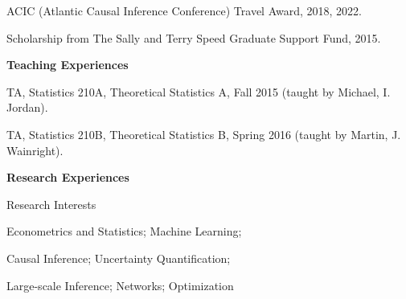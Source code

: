 \documentclass{article}
\begin{document}
\vspace{2mm}
ACIC (Atlantic Causal Inference Conference) Travel Award, 2018, 2022.

\vspace{2mm}
Scholarship from The Sally and Terry Speed Graduate Support Fund, 2015.

\vspace{5mm}
\begin{large}
\noindent \textbf{Teaching Experiences}
\end{large}
\vspace{5mm}

TA, Statistics 210A, Theoretical Statistics A, Fall 2015 (taught by Michael, I. Jordan). 



\vspace{2mm}
TA, Statistics 210B, Theoretical Statistics B, Spring 2016 (taught by Martin, J. Wainright). 




\vspace{5mm}
\begin{large}
\noindent \textbf{Research Experiences}
\end{large}
\vspace{5mm}

\begin{large}
\noindent Research Interests
\end{large}

\vspace{3mm}
Econometrics and Statistics; Machine Learning;

Causal Inference; Uncertainty Quantification;

Large-scale Inference; Networks; Optimization
\end{document}

